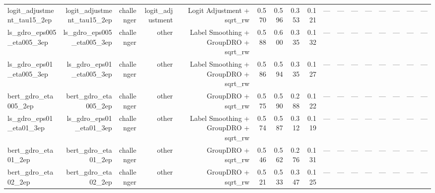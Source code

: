 \begin{tabular}{lrrrrrrrrrrrrrrrr}
logit\_adjustment\_tau15\_2ep & logit\_adjustment\_tau15\_2ep & challenger & logit\_adjustment & Logit Adjustment + sqrt\_rw & 0.570 & 0.596 & 0.353 & 0.121 & --- & --- & --- & --- & --- & --- & --- & --- \\
ls\_gdro\_eps005\_eta005\_3ep & ls\_gdro\_eps005\_eta005\_3ep & challenger & other & Label Smoothing + GroupDRO + sqrt\_rw & 0.588 & 0.600 & 0.335 & 0.132 & --- & --- & --- & --- & --- & --- & --- & --- \\
ls\_gdro\_eps01\_eta005\_3ep & ls\_gdro\_eps01\_eta005\_3ep & challenger & other & Label Smoothing + GroupDRO + sqrt\_rw & 0.586 & 0.594 & 0.335 & 0.127 & --- & --- & --- & --- & --- & --- & --- & --- \\
bert\_gdro\_eta005\_2ep & bert\_gdro\_eta005\_2ep & challenger & other & GroupDRO + sqrt\_rw & 0.575 & 0.590 & 0.288 & 0.122 & --- & --- & --- & --- & --- & --- & --- & --- \\
ls\_gdro\_eps01\_eta01\_3ep & ls\_gdro\_eps01\_eta01\_3ep & challenger & other & Label Smoothing + GroupDRO + sqrt\_rw & 0.574 & 0.587 & 0.312 & 0.119 & --- & --- & --- & --- & --- & --- & --- & --- \\
bert\_gdro\_eta01\_2ep & bert\_gdro\_eta01\_2ep & challenger & other & GroupDRO + sqrt\_rw & 0.546 & 0.562 & 0.276 & 0.131 & --- & --- & --- & --- & --- & --- & --- & --- \\
bert\_gdro\_eta02\_2ep & bert\_gdro\_eta02\_2ep & challenger & other & GroupDRO + sqrt\_rw & 0.521 & 0.533 & 0.347 & 0.125 & --- & --- & --- & --- & --- & --- & --- & --- \\
\bottomrule
\end{tabular}
